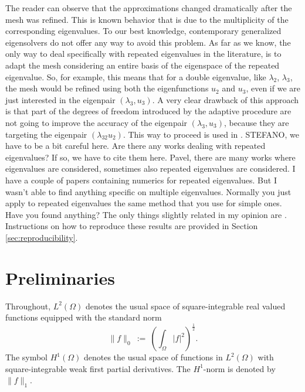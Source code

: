 \documentclass[preprint,12pt]{elsarticle}
\begin{document}
The reader can observe that the approximations changed dramatically after the 
mesh was refined. This is known behavior that is due to the multiplicity of the 
corresponding eigenvalues. To our best knowledge, contemporary generalized 
eigensolvers do not offer any way to avoid this problem. As far as we know, the only way to deal specifically with repeated eigenvalues in the literature, is to adapt the mesh considering an entire basis of the eigenspace of the repeated eigenvalue. So, for example, this means that for a double eigenvalue, like $\lambda_2$, $\lambda_3$, the mesh would be refined using both the eigenfunctions $u_2$ and $u_3$, even if we are just interested in the eigenpair $(\lambda_3, u_3)$. A very clear drawback of this approach is that part of the degrees of freedom introduced by the adaptive procedure are not going to improve the accuracy of the eigenpair $(\lambda_3, u_3)$, because they are targeting the eigenpair $(\lambda_32 u_2)$. This way to proceed is used in \cite{thesis, grubii_estimators_2008}.
{\red STEFANO, we have to be a bit careful here. Are there any works dealing 
with repeated eigenvalues? If so, we have to cite them here.} {\red Pavel, there are many works where eigenvalues are considered, sometimes also repeated eigenvalues are considered. I have a couple of papers containing numerics for repeated eigenvalues. 
But I wasn't able to find anything specific on multiple eigenvalues. 
Normally you just apply to repeated eigenvalues the same method that you use for simple ones.
Have you found anything? The only things slightly related in my opinion are \cite{thesis, grubii_estimators_2008}.}
Instructions on how to reproduce 
these results are provided in Section \ref{sec:reproducibility}.


\section{Preliminaries}\label{sec:preli}

Throughout, $L^2(\Omega)$
denotes the usual space of square-integrable real valued functions
equipped with the standard norm
\begin{equation}\label{eq:l2}
\|f\|_{0}\ := \ \left(\int_\Omega  |f|^2\right)^{\frac{1}{2}} .
\end{equation}
The symbol $H^1(\Omega)$ denotes the usual space of functions in $L^2(\Omega)$
with square-integrable weak first partial derivatives. The $H^1$-norm is 
denoted by $\|f\|_1$.
\end{document}
